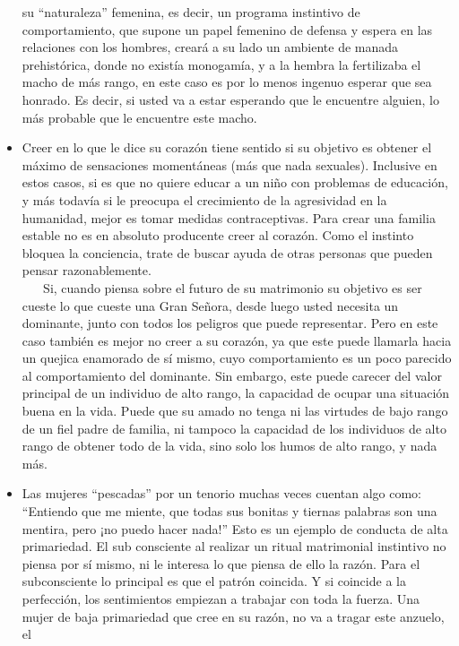 \begin{itemize}
  su ``naturaleza'' femenina, es decir, un programa instintivo de
  comportamiento, que supone un papel femenino de defensa y espera en
  las relaciones con los hombres, creará a su lado un ambiente de manada
  prehistórica, donde no existía monogamía, y a la hembra la fertilizaba
  el macho de más rango, en este caso es por lo menos ingenuo esperar
  que sea honrado. Es decir, si usted va a estar esperando que le
  encuentre alguien, lo más probable que le encuentre este macho.
\item
  Creer en lo que le dice su corazón tiene sentido si su objetivo es
  obtener el máximo de sensaciones momentáneas (más que nada sexuales).
  Inclusive en estos casos, si es que no quiere educar a un niño con
  problemas de educación, y más todavía si le preocupa el crecimiento de
  la agresividad en la humanidad, mejor es tomar medidas contraceptivas.
  Para crear una familia estable no es en absoluto producente creer al
  corazón. Como el instinto bloquea la conciencia, trate de buscar ayuda
  de otras personas que pueden pensar razonablemente.\\
  \hspace*{0.333em} ~ ~ Si, cuando piensa sobre el futuro de su
  matrimonio su objetivo es ser cueste lo que cueste una Gran Señora,
  desde luego usted necesita un dominante, junto con todos los peligros
  que puede representar. Pero en este caso también es mejor no creer a
  su corazón, ya que este puede llamarla hacia un quejica enamorado de
  sí mismo, cuyo comportamiento es un poco parecido al comportamiento
  del dominante. Sin embargo, este puede carecer del valor principal de
  un individuo de alto rango, la capacidad de ocupar una situación buena
  en la vida. Puede que su amado no tenga ni las virtudes de bajo rango
  de un fiel padre de familia, ni tampoco la capacidad de los individuos
  de alto rango de obtener todo de la vida, sino solo los humos de alto
  rango, y nada más.
\item
  Las mujeres ``pescadas'' por un tenorio muchas veces cuentan algo
  como: ``Entiendo que me miente, que todas sus bonitas y tiernas
  palabras son una mentira, pero ¡no puedo hacer nada!'' Esto es un
  ejemplo de conducta de alta primariedad. El sub consciente al realizar
  un ritual matrimonial instintivo no piensa por sí mismo, ni le
  interesa lo que piensa de ello la razón. Para el subconsciente lo
  principal es que el patrón coincida. Y si coincide a la perfección,
  los sentimientos empiezan a trabajar con toda la fuerza. Una mujer de
  baja primariedad que cree en su razón, no va a tragar este anzuelo, el

\end{itemize}
